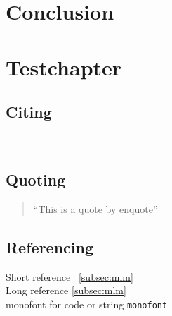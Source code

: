 \documentclass[12pt, a4paper, english]{ttlab-qualify}
\begin{document}
    \chapter{Conclusion}
    \label{ch:conclusion}

    \chapter{\latex Testchapter}
    \section{Citing}
    ~\cite{GERPARCOR}
    \section{Quoting}
    \begin{quote}
        \enquote{This is a quote by enquote}
    \end{quote}

    \section{Referencing}
    Short reference ~\ref{subsec:mlm}\\
    Long reference \autoref{subsec:mlm}\\
    monofont for code or string \texttt{monofont}

    \appendix
    \printbibliography
\end{document}
